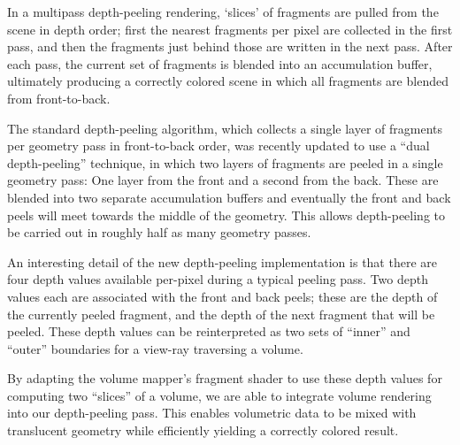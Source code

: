 In a multipass depth-peeling rendering, `slices' of fragments are
pulled from the scene in depth order; first the nearest fragments per
pixel are collected in the first pass, and then the fragments just
behind those are written in the next pass. After each pass, the
current set of fragments is blended into an accumulation buffer,
ultimately producing a correctly colored scene in which all fragments
are blended from front-to-back.

The standard depth-peeling algorithm, which collects a single layer of
fragments per geometry pass in front-to-back order, was recently
updated to use a ``dual depth-peeling''
technique\cite{dualdepthwhitepaper}, in which two layers of fragments
are peeled in a single geometry pass: One layer from the front and a
second from the back. These are blended into two separate accumulation
buffers and eventually the front and back peels will meet towards the
middle of the geometry. This allows depth-peeling to be carried out in
roughly half as many geometry passes.

An interesting detail of the new depth-peeling implementation is that
there are four depth values available per-pixel during a typical
peeling pass. Two depth values each are associated with the front and
back peels; these are the depth of the currently peeled fragment, and
the depth of the next fragment that will be peeled. These depth values
can be reinterpreted as two sets of ``inner'' and ``outer'' boundaries
for a view-ray traversing a volume.

By adapting the volume mapper's fragment shader to use these depth
values for computing two ``slices'' of a volume, we are able to
integrate volume rendering into our depth-peeling pass. This enables
volumetric data to be mixed with translucent geometry while
efficiently yielding a correctly colored result.
 
